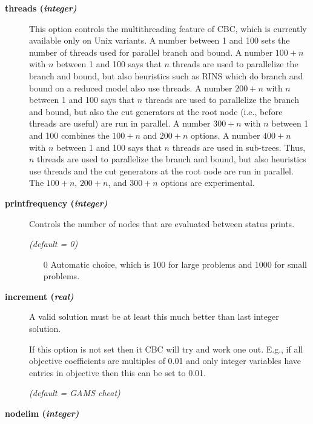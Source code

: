 \begin{description}
\item[\label{threads}\hypertarget{threads}
{\textbf{threads (\slshape{integer})}}]\hspace{1.0in}

This option controls the multithreading feature of CBC, which is currently available only on Unix variants.
A number between 1 and 100 sets the number of threads used for parallel branch and bound.
A number $100+n$ with $n$ between 1 and 100 says that $n$ threads are used to parallelize the branch and bound, but also heuristics such as RINS which do branch and bound on a reduced model also use threads.
A number $200+n$ with $n$ between 1 and 100 says that $n$ threads are used to parallelize the branch and bound, but also the cut generators at the root node (i.e., before threads are useful) are run in parallel.
A number $300+n$ with $n$ between 1 and 100 combines the $100+n$ and $200+n$ options.
A number $400+n$ with $n$ between 1 and 100 says that $n$ threads are used in sub-trees.
Thus, $n$ threads are used to parallelize the branch and bound, but also heuristics use threads and the cut generators at the root node are run in parallel.
The $100+n$, $200+n$, and $300+n$ options are experimental.


\item[\label{printfrequency}\hypertarget{printfrequency}
{\textbf{printfrequency (\slshape{integer})}}]\hspace{1.0in}

Controls the number of nodes that are evaluated between status prints.

\textsl{(default = 0)}
\begin{itemize}
\item[0] 
Automatic choice, which is 100 for large problems and 1000 for small problems.
\end{itemize}

\item[\label{increment}\hypertarget{increment}
{\textbf{increment (\slshape{real})}}]\hspace{1.0in}

A valid solution must be at least this much better than last integer solution.

If this option is not set then it CBC will try and work one out.
E.g., if all objective coefficients are multiples of 0.01 and only integer variables have entries in objective then this can be set to 0.01.

\textsl{(default = GAMS cheat)}

\item[\label{nodelim}\hypertarget{nodelim}
{\textbf{nodelim (\slshape{integer})}}]\hspace{1.0in}


\end{description}
